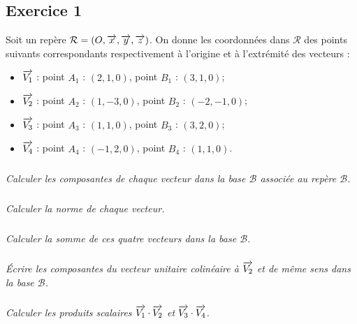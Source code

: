 \documentclass[11pt,oneside]{article}
\begin{document}
\subsection*{Exercice 1}
Soit un repère $\mathcal{R}=\left(O,\overrightarrow{x},\overrightarrow{y},\overrightarrow{z} \right)$. On donne les coordonnées dans $\mathcal{R}$ des points suivants correspondants respectivement à l'origine et à l'extrémité des vecteurs :
\begin{itemize}
\item $\overrightarrow{V_1}$ : point $A_1$ : $(2,1,0)$, point $B_1$ : $(3,1,0)$;
\item $\overrightarrow{V_2}$ : point $A_2$ : $(1,-3,0)$, point $B_2$ : $(-2,-1,0)$;
\item $\overrightarrow{V_3}$ : point $A_3$ : $(1,1,0)$, point $B_3$ : $(3,2,0)$;
\item $\overrightarrow{V_4}$ : point $A_4$ : $(-1,2,0)$, point $B_4$ : $(1,1,0)$.
\end{itemize}

\subparagraph{}
\textit{Calculer les composantes de chaque vecteur dans la base $\mathcal{B}$ associée au repère $\mathcal{B}$.}




\subparagraph{}
\textit{Calculer la norme de chaque vecteur.}


\subparagraph{}
\textit{Calculer la somme de ces quatre vecteurs dans la base $\mathcal{B}$.}


\subparagraph{}
\textit{Écrire les composantes du vecteur unitaire colinéaire à $\overrightarrow{V_2}$ et de même sens dans la base $\mathcal{B}$. }


\subparagraph{}
\textit{Calculer les produits scalaires $\overrightarrow{V_1}\cdot \overrightarrow{V_2}$ et  $\overrightarrow{V_3}\cdot \overrightarrow{V_4}$.}

\end{document}
